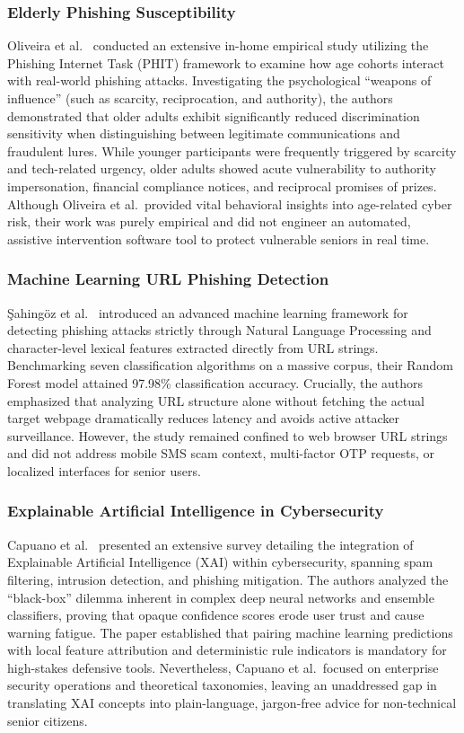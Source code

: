 \documentclass[conference]{IEEEtran}
\begin{document}
\subsubsection{Elderly Phishing Susceptibility}
Oliveira et al.~\cite{oliveira2017dissecting} conducted an extensive in-home empirical study utilizing the Phishing Internet Task (PHIT) framework to examine how age cohorts interact with real-world phishing attacks. Investigating the psychological ``weapons of influence'' (such as scarcity, reciprocation, and authority), the authors demonstrated that older adults exhibit significantly reduced discrimination sensitivity when distinguishing between legitimate communications and fraudulent lures. While younger participants were frequently triggered by scarcity and tech-related urgency, older adults showed acute vulnerability to authority impersonation, financial compliance notices, and reciprocal promises of prizes. Although Oliveira et al.\ provided vital behavioral insights into age-related cyber risk, their work was purely empirical and did not engineer an automated, assistive intervention software tool to protect vulnerable seniors in real time.

\subsubsection{Machine Learning URL Phishing Detection}
\c{S}ahing{\"{o}}z et al.~\cite{sahingoz2019machine} introduced an advanced machine learning framework for detecting phishing attacks strictly through Natural Language Processing and character-level lexical features extracted directly from URL strings. Benchmarking seven classification algorithms on a massive corpus, their Random Forest model attained 97.98\% classification accuracy. Crucially, the authors emphasized that analyzing URL structure alone without fetching the actual target webpage dramatically reduces latency and avoids active attacker surveillance. However, the study remained confined to web browser URL strings and did not address mobile SMS scam context, multi-factor OTP requests, or localized interfaces for senior users.

\subsubsection{Explainable Artificial Intelligence in Cybersecurity}
Capuano et al.~\cite{capuano2022explainable} presented an extensive survey detailing the integration of Explainable Artificial Intelligence (XAI) within cybersecurity, spanning spam filtering, intrusion detection, and phishing mitigation. The authors analyzed the ``black-box'' dilemma inherent in complex deep neural networks and ensemble classifiers, proving that opaque confidence scores erode user trust and cause warning fatigue. The paper established that pairing machine learning predictions with local feature attribution and deterministic rule indicators is mandatory for high-stakes defensive tools. Nevertheless, Capuano et al.\ focused on enterprise security operations and theoretical taxonomies, leaving an unaddressed gap in translating XAI concepts into plain-language, jargon-free advice for non-technical senior citizens.
\end{document}
